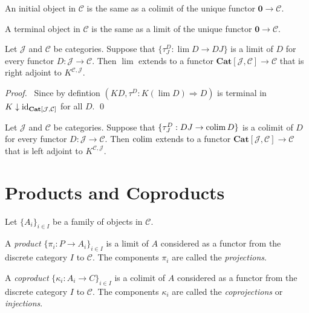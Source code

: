 \begin{prop}
An initial object in $\mathcal{C}$ is the same as a colimit of the unique functor $\mathbf{0} \rightarrow \mathcal{C}$.
\end{prop}

\begin{prop}
A terminal object in $\mathcal{C}$ is the same as a limit of the unique functor $\mathbf{0} \rightarrow \mathcal{C}$.
\end{prop}

\begin{thm}
Let $\mathcal{J}$ and $\mathcal{C}$ be categories. Suppose that $\{ \tau^D_J : \lim D \rightarrow D J \}$ is a limit of $D$ for every functor $D : \mathcal{J} \rightarrow \mathcal{C}$. Then $\lim$ extends to a functor $\mathbf{Cat}[\mathcal{J},\mathcal{C}] \rightarrow \mathcal{C}$ that is right adjoint to $K^{\mathcal{C},\mathcal{J}}$.
\end{thm}

\begin{proof}
\pf\ Since by defintion $(KD, \tau^D : K(\lim D) \Rightarrow D)$ is terminal in $K \downarrow \mathrm{id}_{\mathbf{Cat}[\mathcal{J},\mathcal{C}]}$ for all $D$. \qed
\end{proof}

\begin{thm}
Let $\mathcal{J}$ and $\mathcal{C}$ be categories. Suppose that $\{ \tau^D_J : D J \rightarrow \operatorname{colim} D \}$ is a colimit of $D$ for every functor $D : \mathcal{J} \rightarrow \mathcal{C}$. Then $\operatorname{colim}$ extends to a functor $\mathbf{Cat}[\mathcal{J},\mathcal{C}] \rightarrow \mathcal{C}$ that is left adjoint to $K^{\mathcal{C},\mathcal{J}}$.
\end{thm}

\section{Products and Coproducts}

\begin{df}[Product]
Let $\{ A_i \}_{i \in I}$ be a family of objects in $\mathcal{C}$. 

A \emph{product} $\{ \pi_i : P \rightarrow A_i \}_{i \in I}$ is a limit of $A$ considered as a functor from the discrete category $I$ to $\mathcal{C}$. The components $\pi_i$ are called the \emph{projections}.

A \emph{coproduct} $\{ \kappa_i : A_i \rightarrow C \}_{i \in I}$ is a colimit of $A$ considered as a functor from the discrete category $I$ to $\mathcal{C}$. The components $\kappa_i$ are called the \emph{coprojections} or \emph{injections}.
\end{df}

